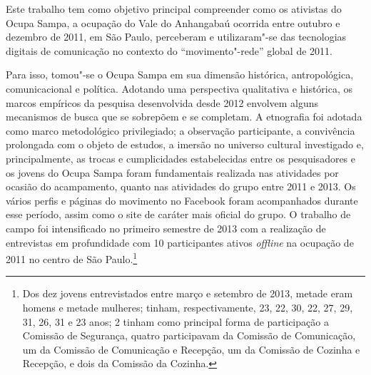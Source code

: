 Este trabalho tem como objetivo principal compreender como os
ativistas do Ocupa Sampa, a ocupação do Vale do Anhangabaú ocorrida
entre outubro e dezembro de 2011, em São Paulo, perceberam e
utilizaram"-se das tecnologias digitais de comunicação no contexto do
``movimento"-rede'' global de 2011.

Para isso, tomou"-se o Ocupa Sampa em sua dimensão histórica,
antropológica, comunicacional e política. Adotando uma perspectiva
qualitativa e histórica, os marcos empíricos da pesquisa desenvolvida
desde 2012 envolvem alguns mecanismos de busca que se sobrepõem e se
completam. A etnografia foi adotada como marco metodológico
privilegiado; a observação participante, a convivência prolongada com o
objeto de estudos, a imersão no universo cultural investigado e,
principalmente, as trocas e cumplicidades estabelecidas entre os
pesquisadores e os jovens do Ocupa Sampa foram fundamentais realizada
nas atividades por ocasião do acampamento, quanto nas atividades do
grupo entre 2011 e 2013. Os vários perfis e páginas do movimento no
Facebook foram acompanhados durante esse período, assim como o site de
caráter mais oficial do grupo. O trabalho de campo foi intensificado no
primeiro semestre de 2013 com a realização de entrevistas em
profundidade com 10 participantes ativos \emph{offline} na ocupação
de 2011 no centro de São Paulo.\footnote{Dos dez jovens entrevistados entre março e setembro de 2013, metade eram homens e metade mulheres; tinham, respectivamente, 23, 22, 30, 22, 27, 29, 31, 26, 31 e 23 anos; 2 tinham como principal forma de participação a Comissão de Segurança, quatro participavam da Comissão de Comunicação, um da 
Comissão de Comunicação e Recepção, um da Comissão de Cozinha e Recepção, e dois da
Comissão da Cozinha.}

